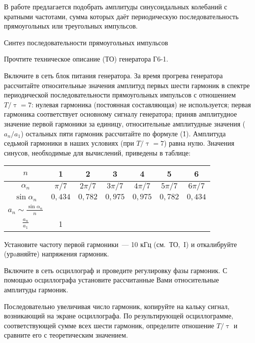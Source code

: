 \begin{lab:task}
	
В работе предлагается подобрать амплитуды синусоидальных колебаний с кратными частотами, сумма которых даёт
периодическую последовательность прямоугольных или треугольных импульсов.

\zn Синтез последовательности прямоугольных импульсов

\n Прочтите техническое описание (ТО) генератора Г6-1.

\n [p3] Включите в сеть блок питания генератора. За время прогрева генератора рассчитайте относительные значения
амплитуд первых шести гармоник в спектре периодической последовательности прямоугольных импульсов с отношением
$T/\uptau=7$: нулевая гармоника (постоянная составляющая) не используется; первая гармоника соответствует основному
сигналу генератора; приняв амплитудное значение первой гармоники за единицу, относительные амплитудные значения
($a_n/a_1$) остальных пяти гармоник рассчитайте по формуле (\r1). Амплитуда седьмой гармоники в наших условиях (при
$T/\uptau=7$) равна нулю. Значения синусов, необходимые для вычислений, приведены в таблице:

\begin{center}
\begin{tabular}{|c|c|c|c|c|c|c|} \hline
$n$ & 1 & 2 & 3 & 4 & 5 & 6 \\ \hline $\alpha_n$&$\pi /7$&$2\pi /7$&$3\pi /7$&$4\pi /7$&$5\pi /7$& $6\pi /7$ \\ \hline
$\sin \alpha_n$ & $0{,}434$ & $0{,}782$ & $0{,}975$ & $0{,}975$ &$0{,}782$ & $0{,}434$ \\ \hline $a_n\sim\frac{\sin
\alpha_n}{n}$& & & & & & \\ \hline $\frac{a_n}{a_1}$&1& & & & & \\ \hline
\end{tabular}
\end{center}

\n Установите частоту первой гармоники~--- 10 кГц (см.~ТО,~I) и откалибруйте (урaвняйте) напряжения гармоник.

\n Включите в сеть осциллограф и проведите регулировку фазы гармоник. С помощью осциллографа установите рассчитанные
Вами относительные амплитуды гармоник.

\n Последовательно увеличивая число гармоник, копируйте на кальку сигнал, возникающий на экране осциллографа. По
результирующей осциллограмме, соответствующей сумме всех шести гармоник, определите отношение $T/\uptau$ и сравните его
с теоретическим значением.


\end{lab:task}
